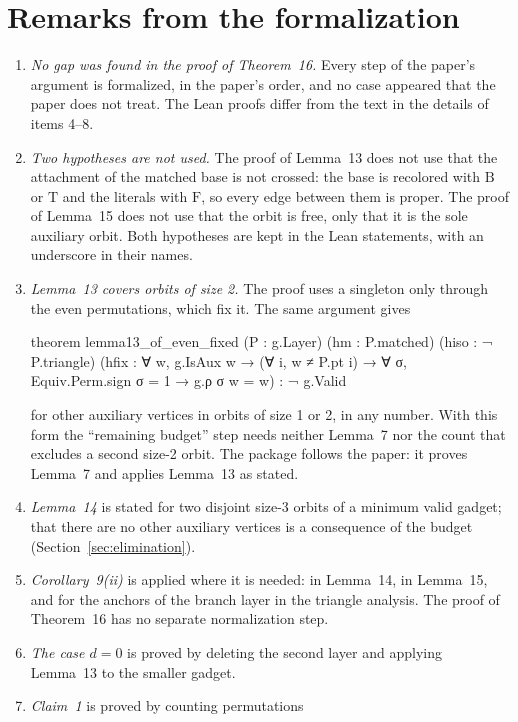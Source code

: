\documentclass[11pt,a4paper]{article}
\newcommand{\T}{\mathrm{T}}
\newcommand{\F}{\mathrm{F}}
\newcommand{\B}{\mathrm{B}}
\begin{document}
\section{Remarks from the formalization}\label{sec:remarks}

\begin{enumerate}
\item \emph{No gap was found in the proof of Theorem~16.} Every step of the
paper's argument is formalized, in the paper's order, and no case appeared
that the paper does not treat. The Lean proofs differ from the text in the
details of items 4--8.
\item \emph{Two hypotheses are not used.} The proof of Lemma~13 does not use
that the attachment of the matched base is not crossed: the base is recolored
with $\B$ or $\T$ and the literals with $\F$, so every edge between them is
proper. The proof of Lemma~15 does not use that the orbit is free, only that
it is the sole auxiliary orbit. Both hypotheses are kept in the Lean
statements, with an underscore in their names.
\item \emph{Lemma~13 covers orbits of size 2.} The proof uses a singleton
only through the even permutations, which fix it. The same argument gives
\begin{code}
theorem lemma13_of_even_fixed (P : g.Layer) (hm : P.matched) (hiso : ¬ P.triangle)
    (hfix : ∀ w, g.IsAux w → (∀ i, w ≠ P.pt i) →
      ∀ σ, Equiv.Perm.sign σ = 1 → g.ρ σ w = w) : ¬ g.Valid
\end{code}
for other auxiliary vertices in orbits of size 1 or 2, in any number. With
this form the ``remaining budget'' step needs neither Lemma~7 nor the count
that excludes a second size-2 orbit. The package follows the paper: it
proves Lemma~7 and applies Lemma~13 as stated.
\item \emph{Lemma~14} is stated for two disjoint size-3 orbits of a minimum
valid gadget; that there are no other auxiliary vertices is a consequence of
the budget (Section~\ref{sec:elimination}).
\item \emph{Corollary~9(ii)} is applied where it is needed: in Lemma~14, in
Lemma~15, and for the anchors of the branch layer in the triangle analysis.
The proof of Theorem~16 has no separate normalization step.
\item \emph{The case $d=0$} is proved by deleting the second layer and
applying Lemma~13 to the smaller gadget.
\item \emph{Claim~1} is proved by counting permutations

\end{enumerate}
\end{document}
